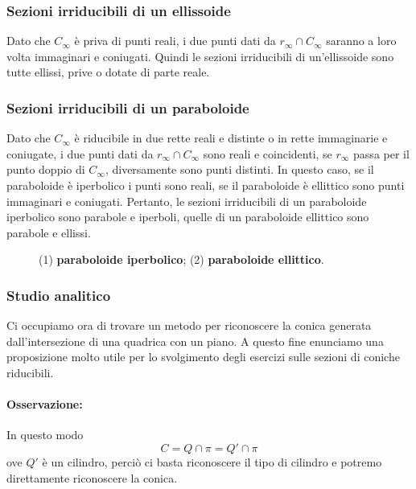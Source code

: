 \subsubsection{Sezioni irriducibili di un ellissoide}
Dato che \(C_\infty\) è priva di punti reali, i due punti dati da \(r_\infty \cap C_\infty\) saranno a loro volta immaginari e coniugati. Quindi le sezioni irriducibili di un'ellissoide sono tutte ellissi, prive o dotate di parte reale.
\vspace{10pt}
\begin{figure}[ht]
    \centering
    \def\svgwidth{180pt}
    \label{fig:sezione-ellissoide}
\end{figure}

\subsubsection{Sezioni irriducibili di un paraboloide}
Dato che \(C_\infty\) è riducibile in due rette reali e distinte o in rette immaginarie e coniugate, i due punti dati da \(r_\infty \cap C_\infty\) sono reali e coincidenti, se \(r_\infty\) passa per il punto doppio di \(C_\infty\), diversamente sono punti distinti. In questo caso, se il paraboloide è iperbolico i punti sono reali, se il paraboloide è ellittico sono punti immaginari e coniugati. Pertanto, le sezioni irriducibili di un paraboloide iperbolico sono parabole e iperboli, quelle di un paraboloide ellittico sono parabole e ellissi.
\vspace{10pt}
\begin{figure}[ht]
    \centering
    \def\svgwidth{300pt}
    \caption{(1) \textbf{paraboloide iperbolico}; (2) \textbf{paraboloide ellittico}.}
    \label{fig:sezioni-paraboloide}
\end{figure}

\subsubsection{Studio analitico}
Ci occupiamo ora di trovare un metodo per riconoscere la conica generata dall'intersezione di una quadrica con un piano. A questo fine enunciamo una proposizione molto utile per lo svolgimento degli esercizi sulle sezioni di coniche riducibili.
\paragraph{Osservazione:} In questo modo \[
C = Q \cap \pi = Q' \cap \pi 
\] ove \(Q'\) è un cilindro, perciò ci basta riconoscere il tipo di cilindro e potremo direttamente riconoscere la conica.
\vspace{10pt}
\begin{figure}[ht]
    \centering
    \def\svgwidth{120pt}
    \label{fig:sezione-cono-cilindro-conica}
\end{figure}
